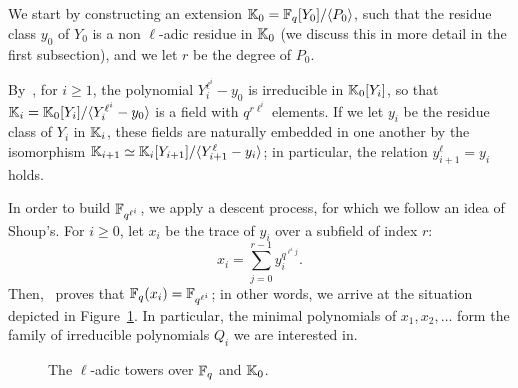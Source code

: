 \documentclass{sig-alternate}
\begin{document}
We start by constructing an extension $\mathbb{K}_0 = \mathbb{F}_q[Y_0]/\langle P_0
\rangle$, such that the residue class $y_0$ of $Y_0$ is a non
$\ell$-adic residue in $\mathbb{K}_0$ (we discuss this in more detail in the
first subsection), and we let $r$ be the degree of $P_0$.

By~\cite[Th.~VI.9.1]{lang}, for $i\ge 1$, the polynomial
$Y_i^{\ell^i}-y_0$ is irreducible in $\mathbb{K}_0[Y_i]$, so that $\mathbb{K}_i=
\mathbb{K}_0[Y_i]/\langle Y_i^{\ell^i}-y_0\rangle$ is a field with $q^{r
  \ell^i}$ elements.  If we let $y_i$ be the residue class of $Y_i$ in
$\mathbb{K}_i$, these fields are naturally embedded in one another by the
isomorphism $\mathbb{K}_{i+1} \simeq \mathbb{K}_i[Y_{i+1}]/\langle
Y_{i+1}^\ell-y_i\rangle$; in particular, the relation
$y_{i+1}^\ell=y_i$ holds.

In order to build $\mathbb{F}_{q^{\ell^i}}$, we apply a descent process, for
which we follow an idea of Shoup's. For $i \ge 0$, let $x_i$ be the
trace of $y_i$ over a subfield of index $r$:
\begin{equation}\label{eq-def:xi}
x_i = \sum_{j = 0}^{r-1} y_i^{q^{\ell^i j}}.  
\end{equation}
Then,~\cite[Th.~2.1]{Shoup90} proves that $\mathbb{F}_q(x_i)=\mathbb{F}_{q^{\ell^i}}$;
in other words, we arrive at the situation depicted in
Figure~\ref{fig:ladic}. In particular, the minimal polynomials of
$x_1,x_2,\dots$ form the family of irreducible polynomials $Q_i$ we
are interested in.

\begin{figure}[h]
  \centering
  \caption{The $\ell$-adic towers over $\mathbb{F}_q$ and $\mathbb{K}_0$.}
  \label{fig:ladic}
\end{figure}
\end{document}

